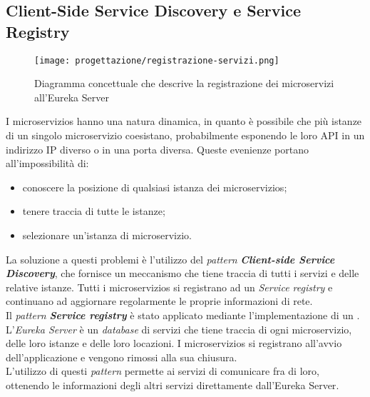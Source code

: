 \subsection{Client-Side Service Discovery e Service Registry}
\label{sub:ServiceRegistry}
\begin{figure}[H]
    \centering
    \texttt{[image: progettazione/registrazione-servizi.png]}
    \caption{Diagramma concettuale che descrive la registrazione dei
        microservizi all'\gls{Eureka Server}}
\end{figure}
I \glspl{microservizio} hanno una natura dinamica, in quanto è possibile che
più istanze di un singolo \gls{microservizio} coesistano, probabilmente
esponendo le loro \gls{API} in un indirizzo \gls{IP} diverso o in una porta
diversa. Queste evenienze portano all'impossibilità di:
\begin{itemize}
    \item conoscere la posizione di qualsiasi istanza dei
          \glspl{microservizio};
    \item tenere traccia di tutte le istanze;
    \item selezionare un'istanza di \gls{microservizio}.
\end{itemize}
La soluzione a questi problemi è l'utilizzo del \textit{pattern}
\textbf{\textit{Client-side Service Discovery}}, che fornisce un meccanismo che
tiene traccia di tutti i servizi e delle relative istanze. Tutti i
\glspl{microservizio} si registrano ad un \textit{Service registry} e
continuano ad aggiornare regolarmente le proprie informazioni di
rete.\cite{site-spring-boot-microservizi}\\
Il \textit{pattern} \textbf{\textit{Service registry}} è stato applicato
mediante l'implementazione di un . L'\textit{Eureka
    Server} è un \textit{database} di servizi che tiene traccia di ogni
\gls{microservizio}, delle loro istanze e delle loro locazioni. I
\glspl{microservizio} si registrano all'avvio dell'applicazione e vengono
rimossi alla sua chiusura.\\
L'utilizzo di questi \textit{pattern}  permette ai servizi di comunicare fra di
loro, ottenendo le informazioni degli altri servizi direttamente
dall'\gls{Eureka Server}.\cite{site-service-registry}
